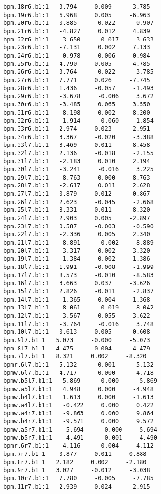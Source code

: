 \begin{verbatim}
bpm.18r6.b1:1   3.794     0.009     -3.785
bpm.19r6.b1:1   6.968     0.005     -6.963
bpm.20r6.b1:1   0.885     -0.022     -0.907
bpm.21r6.b1:1   -4.827     0.012     4.839
bpm.22r6.b1:1   -3.650     -0.017     3.633
bpm.23r6.b1:1   -7.131     0.002     7.133
bpm.24r6.b1:1   -0.978     0.006     0.984
bpm.25r6.b1:1   4.790     0.005     -4.785
bpm.26r6.b1:1   3.764     -0.022     -3.785
bpm.27r6.b1:1   7.771     0.026     -7.745
bpm.28r6.b1:1   1.436     -0.057     -1.493
bpm.29r6.b1:1   -3.678     -0.006     3.672
bpm.30r6.b1:1   -3.485     0.065     3.550
bpm.31r6.b1:1   -8.198     0.002     8.200
bpm.32r6.b1:1   -1.914     -0.060     1.854
bpm.33r6.b1:1   2.974     0.023     -2.951
bpm.34r6.b1:1   3.367     -0.020     -3.388
bpm.33l7.b1:1   8.469     0.011     -8.458
bpm.32l7.b1:1   2.136     -0.018     -2.155
bpm.31l7.b1:1   -2.183     0.010     2.194
bpm.30l7.b1:1   -3.241     -0.016     3.225
bpm.29l7.b1:1   -8.763     0.000     8.763
bpm.28l7.b1:1   -2.617     0.011     2.628
bpm.27l7.b1:1   0.879     0.012     -0.867
bpm.26l7.b1:1   2.623     -0.045     -2.668
bpm.25l7.b1:1   8.331     0.011     -8.320
bpm.24l7.b1:1   2.903     0.005     -2.897
bpm.23l7.b1:1   0.587     -0.003     -0.590
bpm.22l7.b1:1   -2.336     0.005     2.340
bpm.21l7.b1:1   -8.891     -0.002     8.889
bpm.20l7.b1:1   -3.317     0.002     3.320
bpm.19l7.b1:1   -1.384     0.002     1.386
bpm.18l7.b1:1   1.991     -0.008     -1.999
bpm.17l7.b1:1   8.573     -0.010     -8.583
bpm.16l7.b1:1   3.663     0.037     -3.626
bpm.15l7.b1:1   2.826     -0.011     -2.837
bpm.14l7.b1:1   -1.365     0.004     1.368
bpm.13l7.b1:1   -8.061     -0.019     8.042
bpm.12l7.b1:1   -3.567     0.055     3.622
bpm.11l7.b1:1   -3.764     -0.016     3.748
bpm.10l7.b1:1   0.613     0.005     -0.608
bpm.9l7.b1:1   5.073     -0.000     -5.073
bpm.8l7.b1:1   4.475     -0.004     -4.479
bpm.7l7.b1:1   8.321     0.002     -8.320
bpmr.6l7.b1:1   5.132     -0.001     -5.132
bpmw.6l7.b1:1   4.717     -0.000     -4.718
bpmw.b5l7.b1:1   5.869     -0.000     -5.869
bpmw.a5l7.b1:1   4.948     0.000     -4.948
bpmw.b4l7.b1:1   1.613     0.000     -1.613
bpmw.a4l7.b1:1   -0.422     0.000     0.422
bpmw.a4r7.b1:1   -9.863     0.000     9.864
bpmw.b4r7.b1:1   -9.571     0.000     9.572
bpmw.a5r7.b1:1   -5.694     -0.000     5.694
bpmw.b5r7.b1:1   -4.491     -0.001     4.490
bpmr.6r7.b1:1   -4.116     -0.004     4.112
bpm.7r7.b1:1   -0.877     0.011     0.888
bpm.8r7.b1:1   2.182     0.002     -2.180
bpm.9r7.b1:1   3.027     -0.012     -3.038
bpm.10r7.b1:1   7.780     -0.005     -7.785
bpm.11r7.b1:1   2.939     0.024     -2.915

\end{verbatim}
